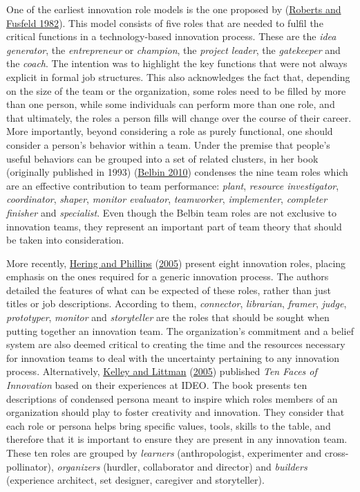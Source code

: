 \documentclass[AMA,STIX1COL,APA,STIX2COL]{WileyNJD-v2}
\begin{document}
One of the earliest innovation role models is the one proposed by
(\protect\hyperlink{ref-Roberts1982}{Roberts and Fusfeld 1982}). This
model consists of five roles that are needed to fulfil the critical
functions in a technology-based innovation process. These are the
\emph{idea generator}, the \emph{entrepreneur} or \emph{champion}, the
\emph{project leader}, the \emph{gatekeeper} and the \emph{coach}. The
intention was to highlight the key functions that were not always
explicit in formal job structures. This also acknowledges the fact that,
depending on the size of the team or the organization, some roles need
to be filled by more than one person, while some individuals can perform
more than one role, and that ultimately, the roles a person fills will
change over the course of their career. More importantly, beyond
considering a role as purely functional, one should consider a person's
behavior within a team. Under the premise that people's useful behaviors
can be grouped into a set of related clusters, in her book (originally
published in 1993) (\protect\hyperlink{ref-Belbin2010}{Belbin 2010})
condenses the nine team roles which are an effective contribution to
team performance: \emph{plant}, \emph{resource investigator},
\emph{coordinator}, \emph{shaper}, \emph{monitor evaluator},
\emph{teamworker}, \emph{implementer}, \emph{completer finisher} and
\emph{specialist}. Even though the Belbin team roles are not exclusive
to innovation teams, they represent an important part of team theory
that should be taken into consideration.

More recently, \protect\hyperlink{ref-Hering2005}{Hering and Phillips}
(\protect\hyperlink{ref-Hering2005}{2005}) present eight innovation
roles, placing emphasis on the ones required for a generic innovation
process. The authors detailed the features of what can be expected of
these roles, rather than just titles or job descriptions. According to
them, \emph{connector}, \emph{librarian}, \emph{framer}, \emph{judge},
\emph{prototyper}, \emph{monitor} and \emph{storyteller} are the roles
that should be sought when putting together an innovation team. The
organization's commitment and a belief system are also deemed critical
to creating the time and the resources necessary for innovation teams to
deal with the uncertainty pertaining to any innovation process.
Alternatively, \protect\hyperlink{ref-Kelley2005}{Kelley and Littman}
(\protect\hyperlink{ref-Kelley2005}{2005}) published \emph{Ten Faces of
Innovation} based on their experiences at IDEO. The book presents ten
descriptions of condensed persona meant to inspire which roles members
of an organization should play to foster creativity and innovation. They
consider that each role or persona helps bring specific values, tools,
skills to the table, and therefore that it is important to ensure they
are present in any innovation team. These ten roles are grouped by
\emph{learners} (anthropologist, experimenter and cross-pollinator),
\emph{organizers} (hurdler, collaborator and director) and
\emph{builders} (experience architect, set designer, caregiver and
storyteller).
\end{document}
